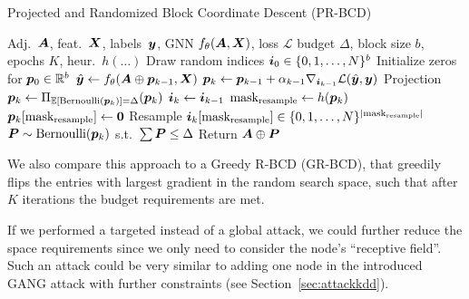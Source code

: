 \documentclass[letterpaper]{article} %
\newcommand{\adj}{\mA}
\newcommand{\features}{\mX}
\begin{document}
\begin{algorithm}[h]
    \small
	\caption{Projected and Randomized Block Coordinate Descent (PR-BCD)}
	\label{algo:prbcd}
	\begin{algorithmic}[1]
         Adj.\ \(\adj\), feat.\ \(\features\), labels\ \({\bm{y}}\), GNN \(f_{\theta}(\adj, \features)\), loss \(\mathcal{L}\)
         budget \(\Delta\), block size \(b\), epochs \(K\), heur.\ \(h(\dots)\)
        \STATE Draw random indices \({\bm{i}}_0 \in \{0, 1, \dots, N\}^b\)
        \STATE Initialize zeros for \({\bm{p}}_0 \in \mathbb{R}^b\)
            \STATE \(\hat{\vy} \leftarrow f_{\theta}(\adj \oplus \vp_{k-1}, \features)\)
            \STATE \({\bm{p}}_{k} \leftarrow {\bm{p}}_{k-1} + \alpha_{k-1} \nabla_{{\bm{i}}_{k-1}} \mathcal{L}(\hat{{\bm{y}}}, {\bm{y}})\)
            \STATE Projection \({\bm{p}}_{k} \leftarrow \Pi_{\mathbb{E}[\text{Bernoulli}({\bm{p}}_k)] = \Delta} ({\bm{p}}_{k})\)
            \STATE \({\bm{i}}_{k} \leftarrow {\bm{i}}_{k-1}\)
                \STATE \(\text{mask}_{\text{resample}} \leftarrow h({\bm{p}}_{k})\)
                \STATE \({\bm{p}}_k[\text{mask}_{\text{resample}}] \leftarrow \mathbf{0}\)
                \STATE Resample \({\bm{i}}_{k}[\text{mask}_{\text{resample}}] \in \{0, 1, \dots, N\}^{|\text{mask}_{\text{resample}}|}\)
            \ENDIF
        \ENDFOR
        \STATE \({\bm{P}} \sim \text{Bernoulli}({\bm{p}}_{k})\) s.t.\ \(\sum {\bm{P}} \le \Delta\)
        \STATE Return \(\adj \oplus \mP\)
	\end{algorithmic}
\end{algorithm}

We also compare this approach to a Greedy R-BCD (GR-BCD), that greedily flips the entries with largest gradient in the random search space, such that after \(K\) iterations the budget requirements are met.

If we performed a targeted instead of a global attack, we could further reduce the space requirements since we only need to consider the node's ``receptive field''. Such an attack could be very similar to adding one node in the introduced GANG attack with further constraints (see Section~\ref{sec:attackkdd}).
\end{document}

